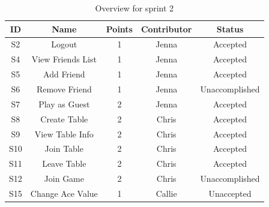\begin{table}[!hbt]
\centering
\caption{Overview for sprint 2}
\label{tab: sprint 2 overview}
\begin{tabular}{|c|c|c|c|c|}
\hline
\textbf{ID} & \textbf{Name}                                                        & \textbf{Points} & \textbf{Contributor} & \textbf{Status}                       \\ \hline
S2          & Logout                                                               & 1               & Jenna                & {\color[HTML]{32CB00} Accepted}       \\ \hline
S4          & View Friends List                                                    & 1               & Jenna                & {\color[HTML]{32CB00} Accepted} \\ \hline
S5          & Add Friend                                                           & 1               & Jenna                & {\color[HTML]{32CB00} Accepted}       \\ \hline
S6          & Remove Friend                                                        & 1               & Jenna                & {\color[HTML]{CB0000} Unaccomplished} \\ \hline
S7          & Play as Guest                                                        & 2               & Jenna                & {\color[HTML]{32CB00} Accepted}       \\ \hline
S8          & Create Table                                                         & 2               & Chris                & {\color[HTML]{32CB00} Accepted}       \\ \hline
S9          & {\color[HTML]{FFC702} View Table Info}                               & 2               & Chris                & {\color[HTML]{32CB00} Accepted}       \\ \hline
S10         & Join Table                                                           & 2               & Chris                & {\color[HTML]{32CB00} Accepted}       \\ \hline
S11         & {\color[HTML]{FFC702} Leave Table}                                   & 2               & Chris                & {\color[HTML]{32CB00} Accepted}       \\ \hline
S12         & Join Game                                                            & 2               & Chris                & {\color[HTML]{CB0000} Unaccomplished} \\ \hline
S15         & Change Ace Value                                                     & 1               & Callie               & {\color[HTML]{CB0000} Unaccepted}     \\ \hline

\end{tabular}
\end{table}

